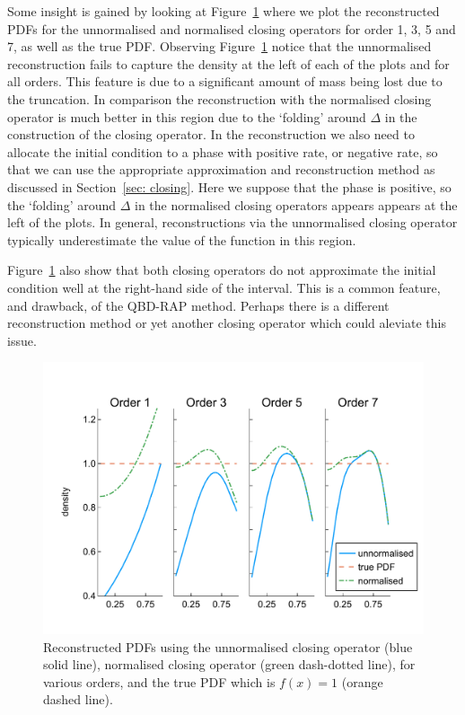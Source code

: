Some insight is gained by looking at Figure~\ref{fig: pdf reconstructed} where we plot the reconstructed PDFs for the unnormalised and normalised closing operators for order 1, 3, 5 and 7, as well as the true PDF. Observing Figure~\ref{fig: pdf reconstructed} notice that the unnormalised reconstruction fails to capture the density at the left of each of the plots and for all orders. This feature is due to a significant amount of mass being lost due to the truncation. In comparison the reconstruction with the normalised closing operator is much better in this region due to the `folding' around \(\Delta\) in the construction of the closing operator. In the reconstruction we also need to allocate the initial condition to a phase with positive rate, or negative rate, so that we can use the appropriate approximation and reconstruction method as discussed in Section~\ref{sec: closing}. Here we suppose that the phase is positive, so the `folding' around \(\Delta\) in the normalised closing operators appears appears at the left of the plots. In general, reconstructions via the unnormalised closing operator typically underestimate the value of the function in this region. 

Figure~\ref{fig: pdf reconstructed} also show that both closing operators do not approximate the initial condition well at the right-hand side of the interval. This is a common feature, and drawback, of the QBD-RAP method. Perhaps there is a different reconstruction method or yet another closing operator which could aleviate this issue. 
\begin{figure}
	\centering
	\includegraphics[width=\textwidth]{chapter5/figs/qbdrap_closing_vec/fun4/pdfs_formatted.pdf}
	\caption{Reconstructed PDFs using the unnormalised closing operator (blue solid line), normalised closing operator (green dash-dotted line), for various orders, and the true PDF which is \(f(x)=1\) (orange dashed line).}
	\label{fig: pdf reconstructed}
\end{figure} 

